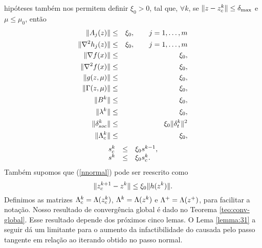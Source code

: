 hipóteses tamb\'em nos permitem definir $\xi_0 > 0$, tal que, $\forall k$, se
$\Vert z - z_c^{k}\Vert \leq \delta_{\max}$ e $\mu \leq \mu_{0}$, ent\~ao 
\begin{eqnarray}
  \norma{A_j(z)} & \leq & \xi_0, \qquad j = 1,\dots,m \visiblelbl{limjacob} \\
  \norma{\nabla^2 h_j(z)} & \leq & \xi_0, \qquad j = 1,\dots,m
  \visiblelbl{limhessh} \\
  \norma{\nabla f(x)} & \leq & \xi_0, \visiblelbl{limgrad} \\
  \norma{\nabla^2 f(x)} & \leq & \xi_0, \visiblelbl{limhess} \\
  \norma{g(z,\mu)} & \leq & \xi_0, \visiblelbl{limgamma} \\
  \norma{\Gamma(z,\mu)} & \leq & \xi_0, \visiblelbl{limGamma} \\
  \norma{B^k} & \leq & \xi_0, \visiblelbl{limB} \\
  \norma{\lk{k}} & \leq & \xi_0, \visiblelbl{limlambda} \\
  \norma{\dsoc^k} & \leq & \xi_0\norma{\delta_t^k}^2 \visiblelbl{limsoc} \\
  \norma{\Lac{k}} & \leq & \xi_0 \visiblelbl{limLac}, 
\end{eqnarray}
  \begin{eqnarray}\visiblelbl{zcompact}
\begin{array}{rcl} s_c^{k} & \leq & \xi_0 s^{k-1}, \\
  s^k & \leq & \xi_0 s_c^{k}. 
\end{array} 
\end{eqnarray} 
Também supomos que (\ref{nnormal}) pode
ser reescrito como 
\begin{equation}\visiblelbl{nnormalxi} 
  \norma{\zc{k+1} - z^k}
\leq \xi_0\norma{h(z^k)}.  
\end{equation} 
Definimos as matrizes $\Lambda_c^{k} = \Lambda(z_c^{k})$, $\Lambda^{k} = \Lambda(z^k)$ e
$\Lambda^+ = \Lambda(z^{+})$, para facilitar a notação. 
  Nosso resultado de convergência global é dado no Teorema
  \ref{teo:conv-global}. Esse resultado depende dos próximos cinco lemas. O
  Lema \ref{lemma:31} a seguir dá um limitante para o aumento da infactibilidade
  do causada pelo passo tangente em relação ao iterando obtido no passo normal.

